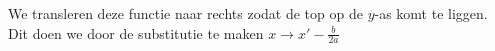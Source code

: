 \documentclass[preview]{standalone}
\begin{document}
\begin{center}
We transleren deze functie naar rechts zodat de top op de $y$-as komt te liggen. \\ Dit doen we door de substitutie te maken $x \rightarrow x' - \frac{b}{2a}$
\end{center}
\end{document}
